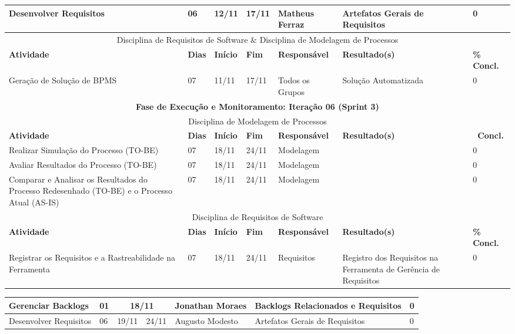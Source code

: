 \begin{landscape}
\begin{center}
\begin{tabular}{|m{6cm}|m{1cm}|m{1cm}|m{1cm}|m{4cm}|m{6cm}|m{2cm}|}
			Desenvolver Requisitos & 06 & 12/11 & 17/11 & Matheus Ferraz & Artefatos Gerais de Requisitos & 0 \\ \hline
			\multicolumn{7}{|c|}{Disciplina de Requisitos de Software \& Disciplina de Modelagem de Processos} \\ \hline
			\textbf{Atividade} & \textbf{Dias} & \textbf{Início} & \textbf{Fim} & \textbf{Responsável} & \textbf{Resultado(s)} & \textbf{\% Concl.} \\ \hline
			Geração de Solução de BPMS & 07 & 11/11 & 17/11 & Todos os Grupos & Solução Automatizada & 0 \\ \hline
			\multicolumn{7}{|c|}{\textbf{Fase de Execução e Monitoramento: Iteração 06 (Sprint 3)}} \\
			\hline
			\multicolumn{7}{|c|}{Disciplina de Modelagem de Processos} \\
			\hline
			\textbf{Atividade} & \textbf{Dias} & \textbf{Início} & \textbf{Fim} & \textbf{Responsável} & \textbf{Resultado(s)} & \textbf{\ Concl.} \\ \hline
			Realizar Simulação do Processo (TO-BE) & 07 & 18/11 & 24/11 & Modelagem & & 0 \\ \hline
			Avaliar Resultados do Processo (TO-BE) & 07 & 18/11 & 24/11 & Modelagem & & 0 \\ \hline
			Comparar e Analisar os Resultados do Processo Redesenhado (TO-BE) e o Processo Atual (AS-IS) & 07 & 18/11 & 24/11 & Modelagem & & 0 \\ \hline
			\multicolumn{7}{|c|}{Disciplina de Requisitos de Software} \\
			\hline
			\textbf{Atividade} & \textbf{Dias} & \textbf{Início} & \textbf{Fim} & \textbf{Responsável} & \textbf{Resultado(s)} & \textbf{\% Concl.} \\ \hline
			Registrar os Requisitos e a Rastreabilidade na Ferramenta & 07 & 18/11 & 24/11 & Requisitos & Registro dos Requisitos na Ferramenta de Gerência de Requisitos & 0 \\ \hline
			\end{tabular}
		\end{center}
		\begin{center}
			\begin{tabular}{|m{6cm}|m{1cm}|m{1cm}|m{1cm}|m{4cm}|m{6cm}|m{2cm}|}
			\hline
			Gerenciar Backlogs & 01 & \multicolumn{2}{c|}{18/11} & Jonathan Moraes & Backlogs Relacionados e Requisitos & 0 \\ \hline
			Desenvolver Requisitos & 06 & 19/11 & 24/11 & Augusto Modesto & Artefatos Gerais de Requisitos & 0 \\ \hline

\end{tabular}
\end{center}
\end{landscape}
